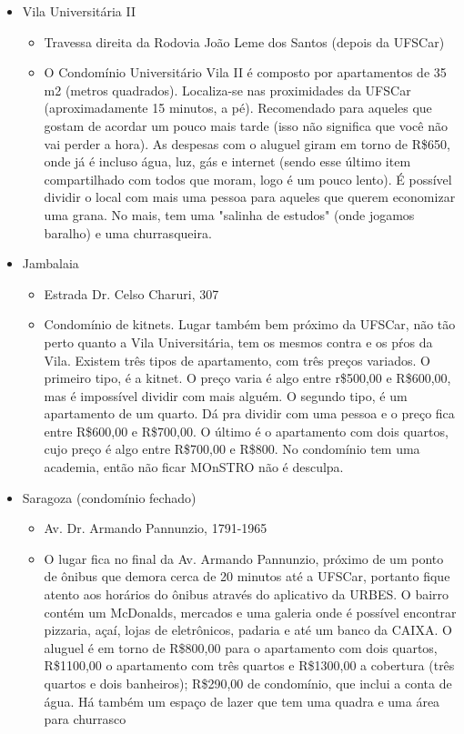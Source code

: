 \begin{itemize}
  \item Vila Universitária II
    \begin{itemize}
      \item Travessa direita da Rodovia João Leme dos Santos (depois da UFSCar)
      \item O Condomínio Universitário Vila II é composto por apartamentos de 35 m2 (metros quadrados). Localiza-se nas proximidades da UFSCar (aproximadamente 15 minutos, a pé). Recomendado para aqueles que gostam de acordar um pouco mais tarde (isso não significa que você não vai perder a hora). As despesas com o aluguel giram em torno de R\$650, onde já é incluso água, luz, gás e internet (sendo esse último item compartilhado com todos que moram, logo é um pouco lento). É possível dividir o local com mais uma pessoa para aqueles que querem economizar uma grana. No mais, tem uma "salinha de estudos" (onde jogamos baralho) e uma churrasqueira.
    \end{itemize}
  \item Jambalaia
    \begin{itemize}
      \item Estrada Dr. Celso Charuri, 307
      \item Condomínio de kitnets. Lugar também bem próximo da UFSCar, não tão perto quanto a Vila Universitária, tem os mesmos contra e os pŕos da Vila. Existem três tipos de apartamento, com três preços variados. O primeiro tipo, é a kitnet. O preço varia é algo entre r\$500,00 e R\$600,00, mas é impossível dividir com mais alguém. O segundo tipo, é um apartamento de um quarto. Dá pra dividir com uma pessoa e o preço fica entre R\$600,00 e R\$700,00. O último é o apartamento com dois quartos, cujo preço é algo entre R\$700,00 e R\$800. No condomínio tem uma academia, então não ficar MOnSTRO não é desculpa.
    \end{itemize}
  \item Saragoza (condomínio fechado)
    \begin{itemize}
      \item Av. Dr. Armando Pannunzio, 1791-1965
      \item{O lugar fica no final da Av. Armando Pannunzio, próximo de um ponto de ônibus que demora cerca de 20 minutos até a UFSCar, portanto fique atento aos horários do ônibus através do aplicativo da URBES. O bairro contém um McDonalds, mercados e uma galeria onde é possível encontrar pizzaria, açaí, lojas de eletrônicos, padaria e até um banco da CAIXA. 
	      O aluguel é em torno de R\$800,00 para o apartamento com dois quartos, R\$1100,00 o apartamento com três quartos e R\$1300,00 a cobertura (três quartos e dois banheiros); R\$290,00 de condomínio, que inclui a conta de água. Há também um espaço de lazer que tem uma quadra e uma área para churrasco}
    \end{itemize}


\end{itemize}
